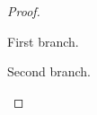 \documentclass{article}
\begin{document}
\begin{proof}
\begin{case}\item First branch.\item Second branch.\end{case}\end{proof}
\end{document}
